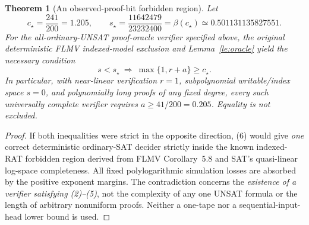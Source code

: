 \documentclass[11pt]{article}
\newtheorem{theorem}{Theorem}
\begin{document}
\begin{theorem}[An observed-proof-bit forbidden region]
\label{th:flmv}
Let
\[
 c_\star=\frac{241}{200}=1.205,\qquad
 s_\star=\frac{11642479}{23232400}
   =\beta(c_\star)\simeq0.501131135827551.
\]
For the \emph{all-ordinary-UNSAT} proof-oracle verifier
specified above, the original deterministic FLMV
indexed-model exclusion and Lemma~\ref{le:oracle}
yield the \emph{necessary} condition
\[
 \boxed{s<s_\star\ \Longrightarrow\
        \max\{1,r+a\}\ge c_\star .}                 \tag{7}
\]
In particular, with near-linear verification
$r=1$, subpolynomial writable/index space $s=0$,
and polynomially long proofs \emph{of any fixed degree},
every such universally complete verifier requires
$a\ge41/200=0.205$. Equality is not excluded.
\end{theorem}
\begin{proof}
If both inequalities were strict in the opposite
direction, (6) would give \emph{one} correct deterministic
ordinary-SAT decider strictly inside the known
indexed-RAT forbidden region derived from FLMV
Corollary~5.8 and SAT's quasi-linear log-space
completeness. All fixed polylogarithmic simulation
losses are absorbed by the positive exponent margins.
The contradiction concerns the \emph{existence of
a verifier satisfying (2)--(5)}, not the complexity
of any one UNSAT formula or the length of arbitrary
nonuniform proofs. Neither a one-tape nor a
sequential-input-head lower bound is used.
\end{proof}
\end{document}
